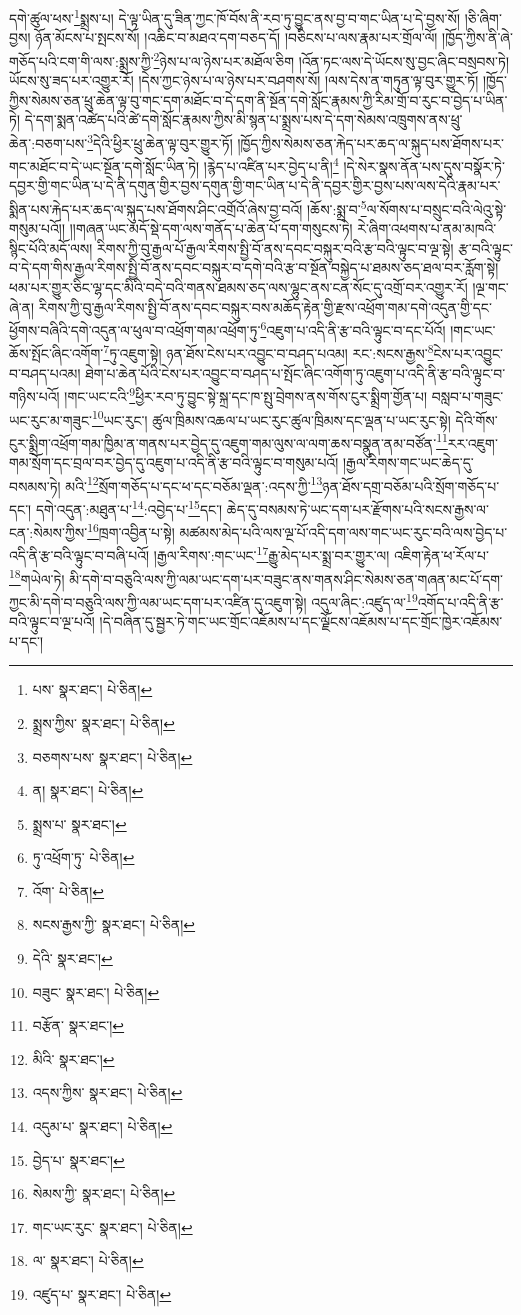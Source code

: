 དགེ་ཚུལ་ཕས་\footnote{པས་  སྣར་ཐང་།  པེ་ཅིན། }སྨྲས་པ། དེ་ལྟ་ཡིན་དུ་ཟིན་ཀྱང་ཁོ་བོས་ནི་རབ་ཏུ་བྱུང་ནས་བྱ་བ་གང་ཡིན་པ་དེ་བྱས་སོ། །ཅི་ཞིག་བྱས། ཉོན་མོངས་པ་སྤངས་སོ། །འཆིང་བ་མཐའ་དག་བཅད་དོ། །བཅིངས་པ་ལས་རྣམ་པར་གྲོལ་ལོ། །ཁྱོད་ཀྱིས་ནི་ཞེ་གཅོད་པའི་ངག་གི་ལས་:སྨྲས་ཀྱི་\footnote{སྨྲས་ཀྱིས་  སྣར་ཐང་།  པེ་ཅིན། }ཉེས་པ་ལ་ཉེས་པར་མཐོལ་ཅིག །འོན་ཏང་ལས་དེ་ཡོངས་སུ་བྱང་ཞིང་བསྲབས་ཏེ། ཡོངས་སུ་ཟད་པར་འགྱུར་རོ། །དེས་ཀྱང་ཉེས་པ་ལ་ཉེས་པར་བཤགས་སོ། །ལས་དེས་ན་གཏུན་ལྟ་བུར་གྱུར་ཏོ། །ཁྱོད་ཀྱིས་སེམས་ཅན་ཕྲུ་ཆེན་ལྟ་བུ་གང་དག་མཐོང་བ་དེ་དག་ནི་སྔོན་དགེ་སློང་རྣམས་ཀྱི་རིམ་གྲོ་བ་རུང་བ་བྱེད་པ་ཡིན་ཏེ། དེ་དག་སྨན་འཚེད་པའི་ཚེ་དགེ་སློང་རྣམས་ཀྱིས་མི་སྙན་པ་སྨྲས་པས་དེ་དག་སེམས་འཁྲུགས་ནས་ཕྲུ་ཆེན་:བཅག་པས་\footnote{བཅགས་པས་  སྣར་ཐང་།  པེ་ཅིན། }དེའི་ཕྱིར་ཕྲུ་ཆེན་ལྟ་བུར་གྱུར་ཏོ། །ཁྱོད་ཀྱིས་སེམས་ཅན་རྐེད་པར་ཆད་ལ་སྐུད་པས་ཐོགས་པར་གང་མཐོང་བ་དེ་ཡང་སྔོན་དགེ་སློང་ཡིན་ཏེ། །རྙེད་པ་འཛིན་པར་བྱེད་པ་ནི།\footnote{ན།  སྣར་ཐང་།  པེ་ཅིན། } །དེ་སེར་སྣས་ནོན་པས་དུས་བསྣོར་ཏེ་དབྱར་གྱི་གང་ཡིན་པ་དེ་ནི་དགུན་གྱིར་བྱས་དགུན་གྱི་གང་ཡིན་པ་དེ་ནི་དབྱར་གྱིར་བྱས་པས་ལས་དེའི་རྣམ་པར་སྨིན་པས་རྐེད་པར་ཆད་ལ་སྐུད་པས་ཐོགས་ཤིང་འགྲོའོ་ཞེས་བྱ་བའོ། །ཆོས་:སྨྲ་བ་\footnote{སྨྲས་པ་  སྣར་ཐང་། }ལ་སོགས་པ་བསྲུང་བའི་ལེའུ་སྟེ་གསུམ་པའོ།། །།གཞན་ཡང་མདོ་སྡེ་དག་ལས་གནོད་པ་ཆེན་པོ་དག་གསུངས་ཏེ། རེ་ཞིག་འཕགས་པ་ནམ་མཁའི་སྙིང་པོའི་མདོ་ལས། རིགས་ཀྱི་བུ་རྒྱལ་པོ་རྒྱལ་རིགས་སྤྱི་བོ་ནས་དབང་བསྐུར་བའི་རྩ་བའི་ལྟུང་བ་ལྔ་སྟེ། རྩ་བའི་ལྟུང་བ་དེ་དག་གིས་རྒྱལ་རིགས་སྤྱི་བོ་ནས་དབང་བསྐུར་བ་དགེ་བའི་རྩ་བ་སྔོན་བསྐྱེད་པ་ཐམས་ཅད་ཐལ་བར་རློག་སྟེ། ཕམ་པར་གྱུར་ཅིང་ལྷ་དང་མིའི་བདེ་བའི་གནས་ཐམས་ཅད་ལས་ལྷུང་ནས་ངན་སོང་དུ་འགྲོ་བར་འགྱུར་རོ། །ལྔ་གང་ཞེ་ན། རིགས་ཀྱི་བུ་རྒྱལ་རིགས་སྤྱི་བོ་ནས་དབང་བསྐུར་བས་མཆོད་རྟེན་གྱི་རྫས་འཕྲོག་གམ་དགེ་འདུན་གྱི་དང་ཕྱོགས་བཞིའི་དགེ་འདུན་ལ་ཕུལ་བ་འཕྲོག་གམ་འཕྲོག་ཏུ་\footnote{ཏུ་འཕྲོག་ཏུ་  པེ་ཅིན། }འཇུག་པ་འདི་ནི་རྩ་བའི་ལྟུང་བ་དང་པོའོ། །གང་ཡང་ཆོས་སྤོང་ཞིང་འགོག་\footnote{འོག་  པེ་ཅིན། }ཏུ་འཇུག་སྟེ། ཉན་ཐོས་ངེས་པར་འབྱུང་བ་བཤད་པའམ། རང་:སངས་རྒྱས་\footnote{སངས་རྒྱས་ཀྱི་  སྣར་ཐང་།  པེ་ཅིན། }ངེས་པར་འབྱུང་བ་བཤད་པའམ། ཐེག་པ་ཆེན་པོའི་ངེས་པར་འབྱུང་བ་བཤད་པ་སྤོང་ཞིང་འགོག་ཏུ་འཇུག་པ་འདི་ནི་རྩ་བའི་ལྟུང་བ་གཉིས་པའོ། །གང་ཡང་ངའི་\footnote{དེའི་  སྣར་ཐང་། }ཕྱིར་རབ་ཏུ་བྱུང་སྟེ་སྐྲ་དང་ཁ་སྤུ་བྲེགས་ནས་གོས་ངུར་སྨྲིག་གྱོན་པ། བསླབ་པ་གཟུང་ཡང་རུང་མ་གཟུང་\footnote{བཟུང་  སྣར་ཐང་།  པེ་ཅིན། }ཡང་རུང་། ཚུལ་ཁྲིམས་འཆལ་པ་ཡང་རུང་ཚུལ་ཁྲིམས་དང་ལྡན་པ་ཡང་རུང་སྟེ། དེའི་གོས་ངུར་སྨྲིག་འཕྲོག་གམ་ཁྱིམ་ན་གནས་པར་བྱེད་དུ་འཇུག་གམ་ལུས་ལ་ལག་ཆས་བསྣུན་ནམ་བཙོན་\footnote{བརྩོན་  སྣར་ཐང་། }རར་འཇུག་གམ་སྲོག་དང་བྲལ་བར་བྱེད་དུ་འཇུག་པ་འདི་ནི་རྩ་བའི་ལྟུང་བ་གསུམ་པའོ། །རྒྱལ་རིགས་གང་ཡང་ཆེད་དུ་བསམས་ཏེ། མའི་\footnote{མིའི་  སྣར་ཐང་། }སྲོག་གཅོད་པ་དང་ཕ་དང་བཅོམ་ལྡན་:འདས་ཀྱི་\footnote{འདས་ཀྱིས་  སྣར་ཐང་།  པེ་ཅིན། }ཉན་ཐོས་དགྲ་བཅོམ་པའི་སྲོག་གཅོད་པ་དང་། དགེ་འདུན་:མཐུན་པ་\footnote{འདུམ་པ་  སྣར་ཐང་།  པེ་ཅིན། }:འབྱེད་པ་\footnote{བྱེད་པ་  སྣར་ཐང་། }དང་། ཆེད་དུ་བསམས་ཏེ་ཡང་དག་པར་རྫོགས་པའི་སངས་རྒྱས་ལ་ངན་:སེམས་ཀྱིས་\footnote{སེམས་ཀྱི་  སྣར་ཐང་།  པེ་ཅིན། }ཁྲག་འབྱིན་པ་སྟེ། མཚམས་མེད་པའི་ལས་ལྔ་པོ་འདི་དག་ལས་གང་ཡང་རུང་བའི་ལས་བྱེད་པ་འདི་ནི་རྩ་བའི་ལྟུང་བ་བཞི་པའོ། །རྒྱལ་རིགས་:གང་ཡང་\footnote{གང་ཡང་རུང་  སྣར་ཐང་།  པེ་ཅིན། }རྒྱུ་མེད་པར་སྨྲ་བར་གྱུར་ལ། འཇིག་རྟེན་ཕ་རོལ་པ་\footnote{ལ་  སྣར་ཐང་།  པེ་ཅིན། }གཡེལ་ཏེ། མི་དགེ་བ་བཅུའི་ལས་ཀྱི་ལམ་ཡང་དག་པར་བཟུང་ནས་གནས་ཤིང་སེམས་ཅན་གཞན་མང་པོ་དག་ཀྱང་མི་དགེ་བ་བཅུའི་ལས་ཀྱི་ལམ་ཡང་དག་པར་འཛིན་དུ་འཇུག་སྟེ། འདུལ་ཞིང་:འཛུད་ལ་\footnote{འཛུད་པ་  སྣར་ཐང་།  པེ་ཅིན། }འགོད་པ་འདི་ནི་རྩ་བའི་ལྟུང་བ་ལྔ་པའོ། །དེ་བཞིན་དུ་སྦྱར་ཏེ་གང་ཡང་གྲོང་འཇོམས་པ་དང་ལྗོངས་འཇོམས་པ་དང་གྲོང་ཁྱེར་འཇོམས་པ་དང་། 
